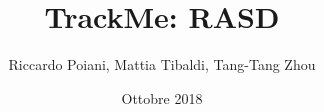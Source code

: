 \documentclass[11pt, a4paper]{article}
\begin{document}
\author{Riccardo Poiani, Mattia Tibaldi, Tang-Tang Zhou }
\title{TrackMe: RASD}
\date{Ottobre 2018}
\maketitle



\tableofcontents







\end{document}
